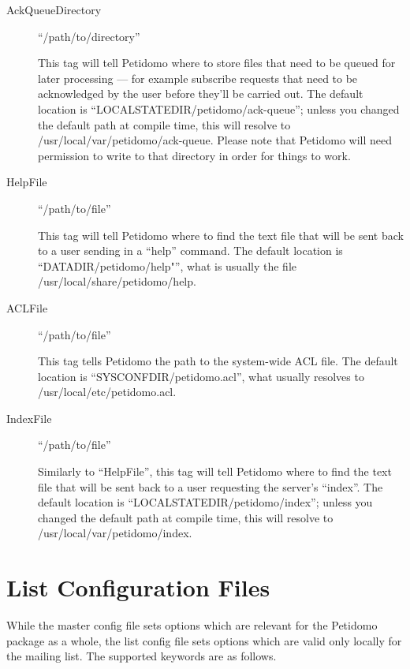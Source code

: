 \documentclass[a4paper,10pt]{scrreprt}
\newcommand{\file}[1]{{\sf #1}}
\begin{document}
\begin{description}
\item[AckQueueDirectory] \hfill ``/path/to/directory''

This tag will tell Petidomo where to store files that need to be
queued for later processing --- for example subscribe requests that
need to be acknowledged by the user before they'll be carried out. The
default location is ``LOCALSTATEDIR/petidomo/ack-queue''; unless you
changed the default path at compile time, this will resolve to
\file{/usr/local/var/petidomo/ack-queue}. Please note that Petidomo
will need permission to write to that directory in order for things to
work.

\item[HelpFile] \hfill ``/path/to/file''

This tag will tell Petidomo where to find the text file that will be
sent back to a user sending in a ``help'' command. The default
location is ``DATADIR/petidomo/help"'', what is usually the file
\file{/usr/local/share/petidomo/help}.


\item[ACLFile] \hfill ``/path/to/file''

This tag tells Petidomo the path to the system-wide ACL file. The
default location is ``SYSCONFDIR/petidomo.acl'', what usually resolves
to \file{/usr/local/etc/petidomo.acl}.

\item[IndexFile] \hfill ``/path/to/file''

Similarly to ``HelpFile'', this tag will tell Petidomo where to find
the text file that will be sent back to a user requesting the server's
``index''. The default location is ``LOCALSTATEDIR/petidomo/index'';
unless you changed the default path at compile time, this will resolve
to \file{/usr/local/var/petidomo/index}.

\end{description}

\section{List Configuration Files}
\label{list config file}

While the master config file sets options which are relevant for the
Petidomo package as a whole, the list config file sets options which
are valid only locally for the mailing list. The supported keywords
are as follows.
\end{document}
